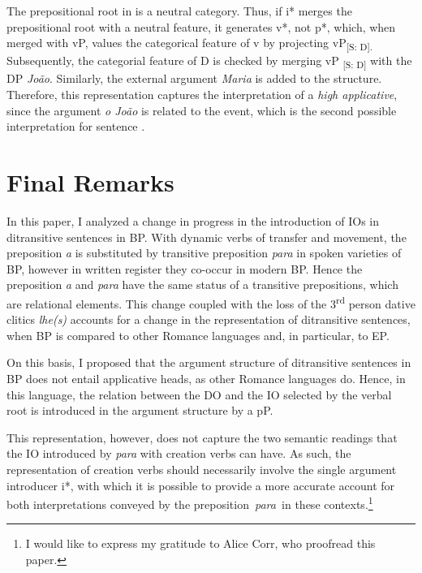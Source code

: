 \documentclass[output=paper,colorlinks,citecolor=brown]{./langscibook}
\begin{document}
The prepositional root in  is a neutral category. Thus, if i* merges the prepositional root with a neutral feature, it generates v*, not p*, which, when merged with vP, values the categorical feature of v by projecting vP\textsubscript{[S: D].} Subsequently, the categorial feature of D is checked by merging vP \textsubscript{[S: D]} with the DP \textit{João}. Similarly, the external argument \textit{Maria} is added to the structure. Therefore, this representation captures the interpretation of a \textit{high applicative}, since the argument \textit{o João} is related to the event, which is the second possible interpretation for sentence .

\section{Final Remarks}\label{sec:calindro:4}

In this paper, I analyzed a change in progress in the introduction of IOs in ditransitive sentences in BP. With dynamic verbs of transfer and movement, the preposition \textit{a} is substituted by transitive preposition \textit{para} in spoken varieties of BP, however in written register they co-occur in modern BP. Hence the preposition \textit{a} and \textit{para} have the same status of a transitive prepositions, which are relational elements. This change coupled with the loss of the 3\textsuperscript{rd} person dative clitics \textit{lhe(s)} accounts for a change in the representation of ditransitive sentences, when BP is compared to other Romance languages and, in particular, to EP.

On this basis, I proposed that the argument structure of ditransitive sentences in BP does not entail applicative heads, as other Romance languages do. Hence, in this language, the relation between the DO and the IO selected by the verbal root is introduced in the argument structure by a pP. 

This representation, however, does not capture the two semantic readings that the IO introduced by \textit{para} with creation verbs can have. As such, the representation of creation verbs should necessarily involve the single argument introducer i*, with which it is possible to provide a more accurate account for both interpretations conveyed by the preposition~\textit{para~}in these contexts.\footnote{I would like to express my gratitude to Alice Corr, who proofread this paper.}

\sloppy\printbibliography[heading=subbibliography,notkeyword=this]
\end{document}
